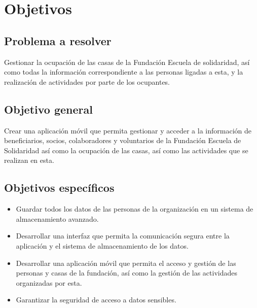 \section{Objetivos}

\subsection{Problema a resolver}

Gestionar la ocupación de las casas de la Fundación Escuela de solidaridad, así como todas la información correspondiente a las personas ligadas a esta, y la realización de actividades por parte de los ocupantes.

\subsection{Objetivo general}

Crear una aplicación móvil que permita gestionar y acceder a la información de beneficiarios, socios, colaboradores y voluntarios de la Fundación Escuela de Solidaridad así como la ocupación de las casas, así como las actividades que se realizan en esta.

\subsection{Objetivos específicos}

\begin{itemize}
    \item Guardar todos los datos de las personas de la organización en un sistema de almacenamiento avanzado.
    \item Desarrollar una interfaz que permita la comunicación segura entre la aplicación y el sistema de almacenamiento de los datos.
    \item Desarrollar una aplicación móvil que permita el acceso y gestión de las personas y casas de la fundación, así como la gestión de las actividades organizadas por esta.
    \item Garantizar la seguridad de acceso a datos sensibles.
\end{itemize}